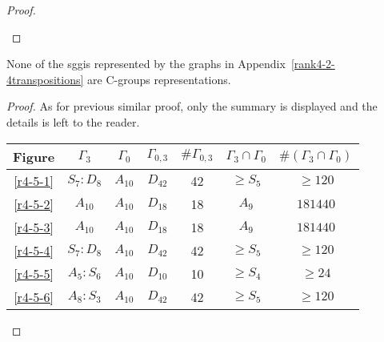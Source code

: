 \begin{proof}
\begin{figure}[H]
\begin{center}
      \caption{}
    \end{center}
  \end{figure}

\end{proof}

\begin{theorem}
  \label{rank4-3-th2}
  None of the sggis represented by the graphs in Appendix~\ref{rank4-2-4transpositions} are C-groups representations.
\end{theorem}

\begin{proof}
  As for previous similar proof, only the summary is displayed and the details is left to the reader.

  \begin{table}[H]
    \centering
    \begin{tabular}{|c|c|c|c|c|c|c|}
      \hline
      Figure & $\Gamma_3$ & $\Gamma_0$ & $\Gamma_{0,3}$ & $\#\Gamma_{0,3}$ & $\Gamma_3 \cap \Gamma_0$ & $\#(\Gamma_3 \cap \Gamma_0)$ \\ \hline

      \ref{r4-5-1} & $S_7 : D_8$ & $A_{10}$ & $D_{42}$ & 42 & $\ge S_5$ & $\ge 120$ \\ \hline
      \ref{r4-5-2} & $A_{10}$ & $A_{10}$ & $D_{18}$ & 18 & $A_9$ & $181440$ \\ \hline
      \ref{r4-5-3} & $A_{10}$ & $A_{10}$ & $D_{18}$ & 18 & $A_9$ & $181440$ \\ \hline
      \ref{r4-5-4} & $S_7 : D_8$ & $A_{10}$ & $D_{42}$ & 42 & $\ge S_5$ & $\ge 120$ \\ \hline
      \ref{r4-5-5} & $A_5 : S_6$ & $A_{10}$ & $D_{10}$ & 10 & $\ge S_4$ & $\ge 24$ \\ \hline
      \ref{r4-5-6} & $A_8 : S_3$ & $A_{10}$ & $D_{42}$ & 42 & $\ge S_5$ & $\ge 120$ \\ \hline

    \end{tabular}
  \end{table}
\end{proof}
